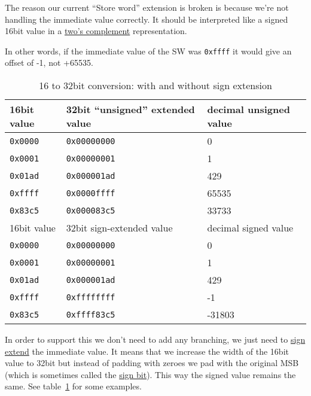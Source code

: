 \documentclass[a4paper]{article}
\newcommand{\code}[1] {\texttt{#1}}
\begin{document}
The reason our current ``Store word'' extension is broken is because
we're not handling the immediate value correctly. It should be
interpreted like a signed 16bit value in a
\href{https://en.wikipedia.org/wiki/Two%27s_complement}{two's complement}
representation.

In other words, if the immediate value of the SW was \code{0xffff}
it would give an offset of -1, not +65535.

\begin{table}[ht]
  \centering

  \begin{tabular}{ l | l | l }
    16bit value & 32bit ``unsigned'' extended value & decimal unsigned value \\
    \hline
    \code{0x0000} & \code{0x00000000} & 0     \\
    \code{0x0001} & \code{0x00000001} & 1     \\
    \code{0x01ad} & \code{0x000001ad} & 429   \\
    \code{0xffff} & \code{0x0000ffff} & 65535 \\
    \code{0x83c5} & \code{0x000083c5} & 33733 \\
    \hline
    \hline
    16bit value & 32bit sign-extended value & decimal signed value \\
    \hline
    \code{0x0000} & \code{0x00000000} & 0      \\
    \code{0x0001} & \code{0x00000001} & 1      \\
    \code{0x01ad} & \code{0x000001ad} & 429    \\
    \code{0xffff} & \code{0xffffffff} & -1     \\
    \code{0x83c5} & \code{0xffff83c5} & -31803 \\
  \end{tabular}

  \caption{16 to 32bit conversion: with and without sign extension}
  \label{tab:signextend}
\end{table}

In order to support this we don't need to add any branching, we just
need to \href{https://en.wikipedia.org/wiki/Sign_extension}{sign
  extend} the immediate value. It means that we increase the width of
the 16bit value to 32bit but instead of padding with zeroes we pad
with the original MSB (which is sometimes called the
\href{https://en.wikipedia.org/wiki/Sign_bit}{sign bit}). This way the
signed value remains the same. See table~\ref{tab:signextend} for some
examples.
\end{document}
